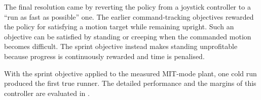 The final resolution came by reverting the policy from a joystick controller to a ``run as fast as possible'' one.
The earlier command-tracking objectives rewarded the policy for satisfying a motion target while remaining upright.
Such an objective can be satisfied by standing or creeping when the commanded motion becomes difficult.
The sprint objective instead makes standing unprofitable because progress is continuously rewarded and time is penalised.

With the sprint objective applied to the measured MIT-mode plant, one cold run produced the first true runner.
The detailed performance and the margins of this controller are evaluated in .
